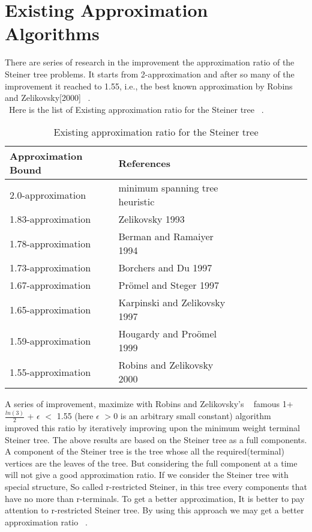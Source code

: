  \section{Existing Approximation Algorithms}
 There are series of research in the improvement the approximation ratio of the Steiner tree problems. It starts from 2-approximation and after so many of the  improvement it reached to 1.55, i.e., the best known approximation by Robins and Zelikovsky[2000] ~\cite{hougardy}.\\\
Here is the list of Existing approximation ratio for the Steiner tree ~\cite{hougardy}.\\
\begin{table}[h]
\label{my-label}
\begin{center}
\begin{tabular}{|l|l|l|l|l|l|l|l|l|}
\hline
Approximation Bound & References \\ \hline
    2.0-approximation  & minimum spanning tree heuristic \\ \hline
    1.83-approximation & Zelikovsky 1993   \\ \hline
    1.78-approximation & Berman and Ramaiyer 1994 \\ \hline
    1.73-approximation & Borchers and Du 1997 \\ \hline
    1.67-approximation & Pr\"{o}mel and Steger 1997 \\ \hline
    1.65-approximation & Karpinski and Zelikovsky 1997 \\ \hline
    1.59-approximation & Hougardy and Pro\"{o}mel 1999 \\ \hline
    1.55-approximation & Robins and Zelikovsky 2000 \\ \hline

\end{tabular}
\end{center}
\caption{Existing approximation ratio for the Steiner tree}
\end{table}
A series of improvement, maximize with Robins and Zelikovsky's ~\cite{byrka} famous 1+$\frac{ln(3)}{2}$ + $\epsilon$ $<$ 1.55 (here $\epsilon$ $>$0 is an arbitrary small constant) algorithm improved this ratio by iteratively improving upon the minimum weight terminal Steiner tree. The above results are based on the Steiner tree as a full components. A component of the Steiner tree is the tree whose all the required(terminal) vertices are the leaves of the tree. But considering the full component at a time will not give a good approximation ratio. If we consider the Steiner tree with special structure, So called r-restricted Steiner, in this tree every components that have no more than r-terminals. To get a better approximation, It is better to pay attention to r-restricted Steiner tree. By using this approach we may get a better approximation ratio ~\cite{byrka}.\\
